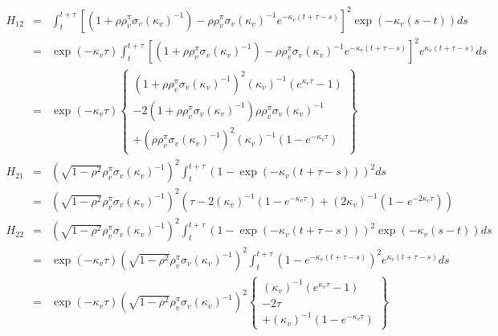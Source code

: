 \documentclass{article}
\begin{document}
\begin{eqnarray*}
H_{12} &=&\int_{t}^{t+\tau }\left[ \left( 1+\rho \rho _{v}^{\pi }\sigma
_{v}\left( \kappa _{v}\right) ^{-1}\right) -\rho \rho _{v}^{\pi }\sigma
_{v}\left( \kappa _{v}\right) ^{-1}e^{-\kappa _{v}\left( t+\tau -s\right) }%
\right] ^{2}\exp \left( -\kappa _{v}\left( s-t\right) \right) ds \\
&=&\exp \left( -\kappa _{v}\tau \right) \int_{t}^{t+\tau }\left[ \left(
1+\rho \rho _{v}^{\pi }\sigma _{v}\left( \kappa _{v}\right) ^{-1}\right)
-\rho \rho _{v}^{\pi }\sigma _{v}\left( \kappa _{v}\right) ^{-1}e^{-\kappa
_{v}\left( t+\tau -s\right) }\right] ^{2}e^{\kappa _{v}\left( t+\tau
-s\right) }ds \\
&=&\exp \left( -\kappa _{v}\tau \right) \left\{ 
\begin{array}{c}
\left( 1+\rho \rho _{v}^{\pi }\sigma _{v}\left( \kappa _{v}\right)
^{-1}\right) ^{2}\left( \kappa _{v}\right) ^{-1}\left( e^{\kappa _{v}\tau
}-1\right)  \\ 
-2\left( 1+\rho \rho _{v}^{\pi }\sigma _{v}\left( \kappa _{v}\right)
^{-1}\right) \rho \rho _{v}^{\pi }\sigma _{v}\left( \kappa _{v}\right) ^{-1}
\\ 
+\left( \rho \rho _{v}^{\pi }\sigma _{v}\left( \kappa _{v}\right)
^{-1}\right) ^{2}\left( \kappa _{v}\right) ^{-1}\left( 1-e^{-\kappa _{v}\tau
}\right) 
\end{array}%
\right\} 
\end{eqnarray*}%
\begin{eqnarray*}
H_{21} &=&\left( \sqrt{1-\rho ^{2}}\rho _{v}^{\pi }\sigma _{v}\left( \kappa
_{v}\right) ^{-1}\right) ^{2}\int_{t}^{t+\tau }\left( 1-\exp \left( -\kappa
_{v}\left( t+\tau -s\right) \right) \right) ^{2}ds \\
&=&\left( \sqrt{1-\rho ^{2}}\rho _{v}^{\pi }\sigma _{v}\left( \kappa
_{v}\right) ^{-1}\right) ^{2}\left( \tau -2\left( \kappa _{v}\right)
^{-1}\left( 1-e^{-\kappa _{v}\tau }\right) +\left( 2\kappa _{v}\right)
^{-1}\left( 1-e^{-2\kappa _{v}\tau }\right) \right) 
\end{eqnarray*}%
\begin{eqnarray*}
H_{22} &=&\left( \sqrt{1-\rho ^{2}}\rho _{v}^{\pi }\sigma _{v}\left( \kappa
_{v}\right) ^{-1}\right) ^{2}\int_{t}^{t+\tau }\left( 1-\exp \left( -\kappa
_{v}\left( t+\tau -s\right) \right) \right) ^{2}\exp \left( -\kappa
_{v}\left( s-t\right) \right) ds \\
&=&\exp \left( -\kappa _{v}\tau \right) \left( \sqrt{1-\rho ^{2}}\rho
_{v}^{\pi }\sigma _{v}\left( \kappa _{v}\right) ^{-1}\right)
^{2}\int_{t}^{t+\tau }\left( 1-e^{-\kappa _{v}\left( t+\tau -s\right)
}\right) ^{2}e^{\kappa _{v}\left( t+\tau -s\right) }ds \\
&=&\exp \left( -\kappa _{v}\tau \right) \left( \sqrt{1-\rho ^{2}}\rho
_{v}^{\pi }\sigma _{v}\left( \kappa _{v}\right) ^{-1}\right) ^{2}\left\{ 
\begin{array}{c}
\left( \kappa _{v}\right) ^{-1}\left( e^{\kappa _{v}\tau }-1\right)  \\ 
-2\tau  \\ 
+\left( \kappa _{v}\right) ^{-1}\left( 1-e^{-\kappa _{v}\tau }\right) 
\end{array}%
\right\} 
\end{eqnarray*}
\end{document}
